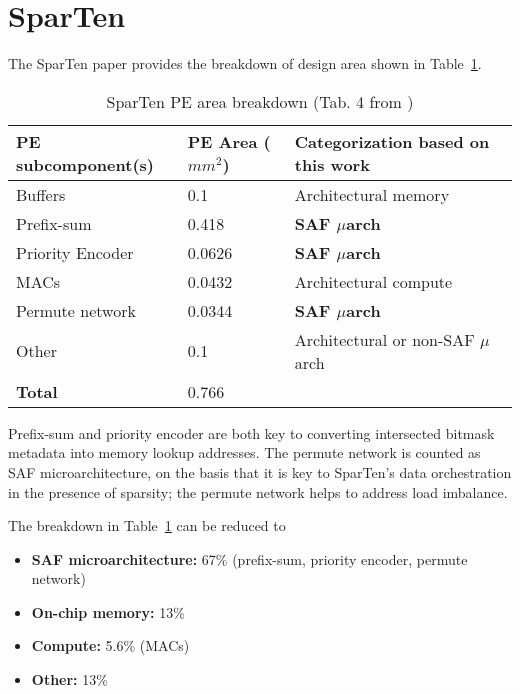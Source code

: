 \section{SparTen\cite{sparten}}

The SparTen paper provides the breakdown of design area shown in Table~\ref{tab:sparten_pe_breakdown}.

\begin{table}[H]
\caption{SparTen PE area breakdown (Tab. 4 from \cite{sparten})}
\label{tab:sparten_pe_breakdown}
\begin{center}
\begin{tabular}{||l|l|l||}\hline
\textbf{PE subcomponent(s)} & \textbf{PE Area ($mm^2$)}  & \textbf{Categorization based on this work}  \\\hline
Buffers	   & 0.1 & Architectural memory \\\hline
Prefix-sum	   & 0.418 & \textbf{SAF $\mu$arch} \\\hline
Priority Encoder	   & 0.0626 & \textbf{SAF $\mu$arch} \\\hline
MACs	   & 0.0432 & Architectural compute \\\hline
Permute network	   & 0.0344 & \textbf{SAF $\mu$arch} \\\hline
Other	   & 0.1 & Architectural or non-SAF $\mu$arch \\\hline
\textbf{Total}	   & 0.766 & \\\hline
\end{tabular}
\end{center}
\end{table}

Prefix-sum and priority encoder are both key to converting intersected bitmask metadata into memory lookup addresses. The permute network is counted as SAF microarchitecture, on the basis that it is key to SparTen's data orchestration in the presence of sparsity; the permute network helps to address load imbalance.

The breakdown in Table~\ref{tab:sparten_pe_breakdown} can be reduced to

\begin{itemize}
    \item \textbf{SAF microarchitecture:} 67\% (prefix-sum, priority encoder, permute network)
    \item \textbf{On-chip memory:} 13\% 
    \item \textbf{Compute:} 5.6\% (MACs)
    \item \textbf{Other:} 13\%
\end{itemize}

